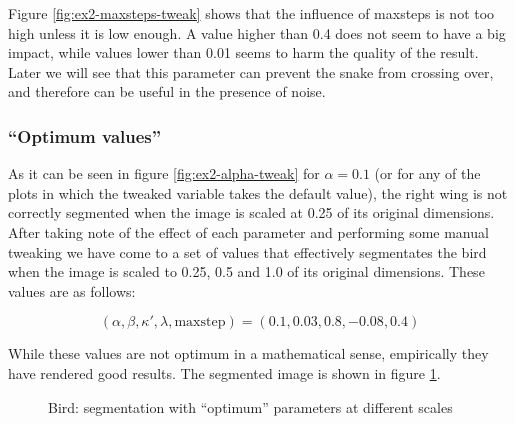 Figure \ref{fig:ex2-maxsteps-tweak} shows that the influence of maxsteps is not too  high unless
it is low enough. A value higher than 0.4 does not seem to have a big impact, while values lower
than 0.01 seems to harm the quality of the result. Later we will see that this parameter can prevent the snake from crossing over, and therefore can be useful in the presence of noise.

\subsubsection{``Optimum values''}

As it can be seen in figure \ref{fig:ex2-alpha-tweak} for
$ \alpha = 0.1 $ (or for any of the plots in which the tweaked variable takes the default value), the right wing is not correctly segmented when the image
is scaled at 0.25 of its original dimensions. After taking note of the effect of each parameter
and performing some manual tweaking we have come to a set of values that effectively segmentates the bird when the image is scaled to 0.25, 0.5 and 1.0 of its original dimensions. These values are as follows:

\[ (\alpha , \beta , \kappa' , \lambda , \mathrm{maxstep} ) = (0.1, 0.03, 0.8, -0.08, 0.4) \]

While these values are not optimum in a mathematical sense, empirically they have rendered good results. The segmented image is shown in figure \ref{fig:bird-segmentated}.

\begin{figure}[!hbt]
\centering
{}
\caption{Bird: segmentation with ``optimum'' parameters at different scales}
\label{fig:bird-segmentated}
\end{figure}

